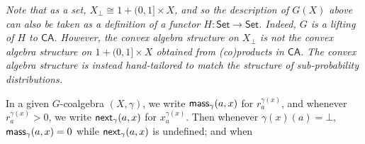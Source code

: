 \documentclass[11pt,a4paper]{amsart}
\begin{document}
\hypertarget{html:S5.Thmtheorem6.p1}{} \emph{Note that as a set, %
\hypertarget{html:S5.Thmtheorem6.p1.m1}{}\({X_{\bot}\cong 1+(0,1]\times X}\), and so the description of %
\hypertarget{html:S5.Thmtheorem6.p1.m2}{}\({G(X)}\) above can also be taken as a definition of a functor %
\hypertarget{html:S5.Thmtheorem6.p1.m3}{}\({H\colon\mathsf{Set}\to\mathsf{Set}}\). Indeed, %
\hypertarget{html:S5.Thmtheorem6.p1.m4}{}\({G}\) is a lifting of %
\hypertarget{html:S5.Thmtheorem6.p1.m5}{}\({H}\) to %
\hypertarget{html:S5.Thmtheorem6.p1.m6}{}\({\mathsf{CA}}\). However, the convex algebra structure on %
\hypertarget{html:S5.Thmtheorem6.p1.m7}{}\({X_{\bot}}\) is not the convex algebra structure on %
\hypertarget{html:S5.Thmtheorem6.p1.m8}{}\({1+(0,1]\times X}\) obtained from (co)products in %
\hypertarget{html:S5.Thmtheorem6.p1.m9}{}\({\mathsf{CA}}\). The convex algebra structure is instead hand-tailored to match the structure of sub-probability distributions.}
\par\medskip
\hypertarget{html:S5.SS0.SSS0.Px1.p5}{} In a given %
\hypertarget{html:S5.SS0.SSS0.Px1.p5.m1}{}\({G}\)-coalgebra %
\hypertarget{html:S5.SS0.SSS0.Px1.p5.m2}{}\({(X,\gamma)}\), we write %
\hypertarget{html:S5.SS0.SSS0.Px1.p5.m3}{}\({\mbox{\sf mass}_{\gamma}(a,x)}\) for %
\hypertarget{html:S5.SS0.SSS0.Px1.p5.m4}{}\({r_{a}^{\gamma(x)}}\), and whenever %
\hypertarget{html:S5.SS0.SSS0.Px1.p5.m5}{}\({r_{a}^{\gamma(x)}>0}\), we write %
\hypertarget{html:S5.SS0.SSS0.Px1.p5.m6}{}\({\mbox{\sf next}_{\gamma}(a,x)}\) for %
\hypertarget{html:S5.SS0.SSS0.Px1.p5.m7}{}\({x_{a}^{\gamma(x)}}\). Then whenever %
\hypertarget{html:S5.SS0.SSS0.Px1.p5.m8}{}\({\gamma(x)(a)=\bot}\), %
\hypertarget{html:S5.SS0.SSS0.Px1.p5.m9}{}\({\mbox{\sf mass}_{\gamma}(a,x)=0}\) while %
\hypertarget{html:S5.SS0.SSS0.Px1.p5.m10}{}\({\mbox{\sf next}_{\gamma}(a,x)}\) is undefined; and when %
\end{document}
